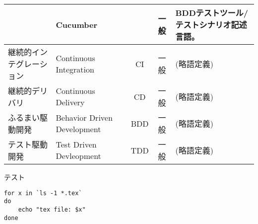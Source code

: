\begin{longtable}{p{8em}|p{8em}|c|c|p{16em}}
  & Cucumber & & 一般 & BDDテストツール/テストシナリオ記述言語。 \\ \hline
  継続的インテグレーション & Continuous Integration & CI & 一般 & (略語定義) \\ \hline
  継続的デリバリ & Continuous Delivery & CD & 一般 & (略語定義) \\ \hline
  ふるまい駆動開発 & Behavior Driven Development & BDD & 一般 & (略語定義) \\ \hline
  テスト駆動開発 & Test Driven Devleopment & TDD & 一般 & (略語定義) \\ \hline
 \end{longtable}

テスト 

\begin{program}
\begin{verbatim}
for x in `ls -1 *.tex`
do
    echo "tex file: $x"
done
\end{verbatim}
\end{program}

